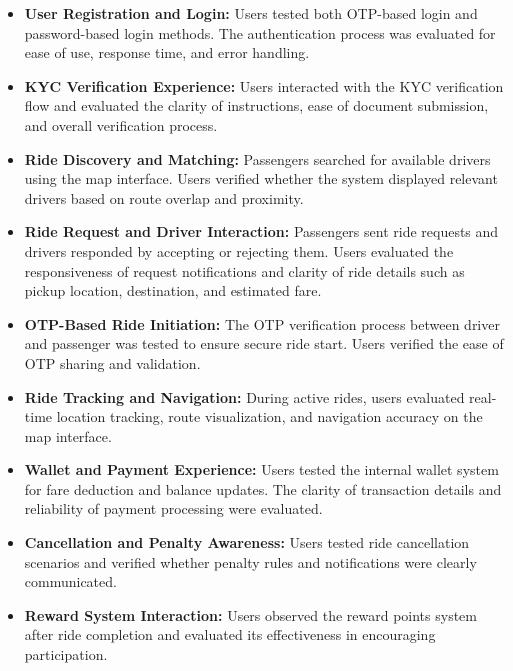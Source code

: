 \documentclass[10pt,a4paper]{report}
\begin{document}
\begin{itemize}

\item \textbf{User Registration and Login:}
Users tested both OTP-based login and password-based login methods. The authentication process was evaluated for ease of use, response time, and error handling.

\item \textbf{KYC Verification Experience:}
Users interacted with the KYC verification flow and evaluated the clarity of instructions, ease of document submission, and overall verification process.

\item \textbf{Ride Discovery and Matching:}
Passengers searched for available drivers using the map interface. Users verified whether the system displayed relevant drivers based on route overlap and proximity.

\item \textbf{Ride Request and Driver Interaction:}
Passengers sent ride requests and drivers responded by accepting or rejecting them. Users evaluated the responsiveness of request notifications and clarity of ride details such as pickup location, destination, and estimated fare.

\item \textbf{OTP-Based Ride Initiation:}
The OTP verification process between driver and passenger was tested to ensure secure ride start. Users verified the ease of OTP sharing and validation.

\item \textbf{Ride Tracking and Navigation:}
During active rides, users evaluated real-time location tracking, route visualization, and navigation accuracy on the map interface.

\item \textbf{Wallet and Payment Experience:}
Users tested the internal wallet system for fare deduction and balance updates. The clarity of transaction details and reliability of payment processing were evaluated.

\item \textbf{Cancellation and Penalty Awareness:}
Users tested ride cancellation scenarios and verified whether penalty rules and notifications were clearly communicated.

\item \textbf{Reward System Interaction:}
Users observed the reward points system after ride completion and evaluated its effectiveness in encouraging participation.

\end{itemize}
\end{document}
